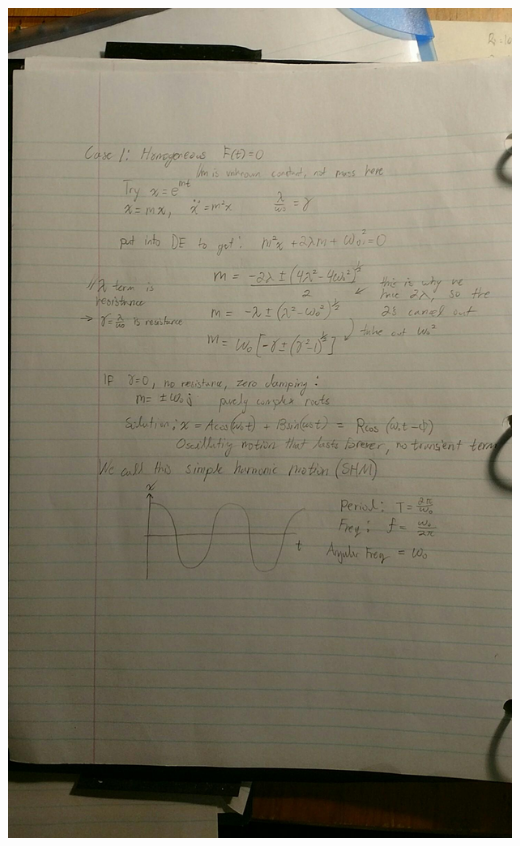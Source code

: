 \documentclass[11pt]{article}
\theoremstyle{definition}
\begin{document}
\includegraphics[width=\textwidth,height=\textheight,keepaspectratio]{friday/2.jpg}\\
\end{document}
